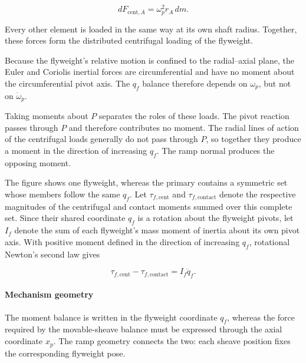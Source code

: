 \documentclass[11pt]{report}
\numberwithin{equation}{section}
\begin{document}
\begin{equation}
    dF_{\mathrm{cent},A}
    =
    \omega_p^2 r_A\,dm.
    \label{eq:primary_flyweight_element_centrifugal_load}
\end{equation}

Every other element is loaded in the same way at its own shaft radius.
Together, these forces form the distributed centrifugal loading of the
flyweight.

Because the flyweight's relative motion is confined to the radial--axial
plane, the Euler and Coriolis inertial forces are circumferential and have no
moment about the circumferential pivot axis. The \(q_f\) balance therefore
depends on \(\omega_p\), but not on \(\dot\omega_p\).

Taking moments about \(P\) separates the roles of these loads. The pivot
reaction passes through \(P\) and therefore contributes no moment. The radial
lines of action of the centrifugal loads generally do not pass through
\(P\), so together they produce a moment in the direction of increasing
\(q_f\). The ramp normal produces the opposing moment.

The figure shows one flyweight, whereas the primary contains a symmetric set
whose members follow the same \(q_f\). Let
\(\tau_{f,\mathrm{cent}}\) and \(\tau_{f,\mathrm{contact}}\) denote the
respective magnitudes of the centrifugal and contact moments summed over this
complete set. Since their shared coordinate \(q_f\) is a rotation about the
flyweight pivots, let \(I_f\) denote the sum of each flyweight's mass moment
of inertia about its own pivot axis. With positive moment defined in the
direction of increasing \(q_f\), rotational Newton's second law gives
\nopagebreak[4]

\begin{equation}
    \tau_{f,\mathrm{cent}}
    -
    \tau_{f,\mathrm{contact}}
    =
    I_f\ddot q_f.
    \label{eq:primary_flyweight_moment_balance}
\end{equation}

\paragraph{Mechanism geometry}

The moment balance is written in the flyweight coordinate \(q_f\), whereas
the force required by the movable-sheave balance must be expressed through
the axial coordinate \(x_p\). The ramp geometry connects the two: each sheave
position fixes the corresponding flyweight pose.
\end{document}
